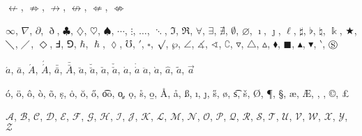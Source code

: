 \documentclass[a4paper,11pt]{article}
\begin{document}
\vspace{1em}





\noindent
$\nleftarrow$, $\nRightarrow$, $\nrightarrow$, $\nleftrightarrow$, $\nLeftarrow$, $\nLeftrightarrow$

\vspace{1em}





\noindent
$\infty$, $\nabla$, $\partial$, $\eth$, $\clubsuit$, $\diamondsuit$, $\heartsuit$, $\spadesuit$, $\cdots$, $\vdots$, $\ldots$, $\ddots$,
$\Im$, $\Re$, $\forall$, $\exists$, $\nexists$, $\emptyset$, $\varnothing$, $\imath$, $\jmath$, $\ell$,
$\sharp$, $\flat$, $\natural$, $\Bbbk$, $\bigstar$, $\diagdown$, $\diagup$, $\Diamond$,
$\Finv$, $\Game$, $\hbar$, $\hslash$, $\lozenge$, $\mho$, $\prime$, $\square$, $\surd$, $\wp$,
$\angle$, $\measuredangle$, $\sphericalangle$, $\complement$, $\triangledown$, $\triangle$, $\vartriangle$, $\blacklozenge$, $\blacksquare$,
$\blacktriangle$, $\blacktriangledown$, $\backprime$, $\circledS$

\vspace{1em}





\noindent
$\acute{a}$, $\bar{a}$, $\acute{A}$, $\acute{\acute{A}}$, $\bar{\bar{a}}$,
$\bar{\bar{A}}$, $\breve{a}$, $\breve{\breve{a}}$, $\check{a}$,
$\check{\check{a}}$, $\dot{a}$, $\dot{\dot{a}}$ $\ddot{a}$,
$\grave{a}$, $\hat{a}$, $\tilde{a}$, $\vec{a}$

\vspace{1em}





\noindent
\'{o}, \"{o}, \^{o}, \`{o}, \~{o}, \d s, \.{o}, \u{o}, \H{o}, \t{oo}, \c{o},
\d{o}, \r s, \b{o}, \AA, \aa, \ss, \i, \j, \H s, \o, \t s, \v s, \O, \P, \S,
\ae, \AE, \dag, \ddag, \copyright, \pounds

\vspace{1em}





\noindent
$\mathcal{A}$, $\mathcal{B}$, $\mathcal{C}$, $\mathcal{D}$, $\mathcal{E}$,
$\mathcal{F}$, $\mathcal{G}$, $\mathcal{H}$, $\mathcal{I}$, $\mathcal{J}$,
$\mathcal{K}$, $\mathcal{L}$, $\mathcal{M}$, $\mathcal{N}$, $\mathcal{O}$,
$\mathcal{P}$, $\mathcal{Q}$, $\mathcal{R}$, $\mathcal{S}$, $\mathcal{T}$,
$\mathcal{U}$, $\mathcal{V}$, $\mathcal{W}$, $\mathcal{X}$, $\mathcal{Y}$,
$\mathcal{Z}$
\end{document}
